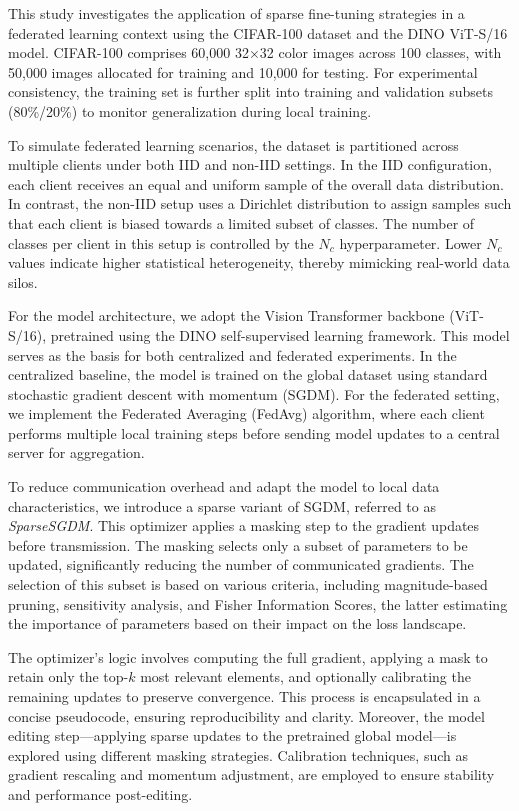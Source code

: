 \documentclass[10pt,twocolumn,letterpaper]{article}
\begin{document}
This study investigates the application of sparse fine-tuning strategies in a federated learning context using the CIFAR-100 dataset and the DINO ViT-S/16 model. CIFAR-100 comprises 60{,}000 32×32 color images across 100 classes, with 50{,}000 images allocated for training and 10{,}000 for testing. For experimental consistency, the training set is further split into training and validation subsets (80\%/20\%) to monitor generalization during local training.

To simulate federated learning scenarios, the dataset is partitioned across multiple clients under both IID and non-IID settings. In the IID configuration, each client receives an equal and uniform sample of the overall data distribution. In contrast, the non-IID setup uses a Dirichlet distribution to assign samples such that each client is biased towards a limited subset of classes. The number of classes per client in this setup is controlled by the $N_c$ hyperparameter. Lower $N_c$ values indicate higher statistical heterogeneity, thereby mimicking real-world data silos.

For the model architecture, we adopt the Vision Transformer backbone (ViT-S/16), pretrained using the DINO self-supervised learning framework. This model serves as the basis for both centralized and federated experiments. In the centralized baseline, the model is trained on the global dataset using standard stochastic gradient descent with momentum (SGDM). For the federated setting, we implement the Federated Averaging (FedAvg) algorithm, where each client performs multiple local training steps before sending model updates to a central server for aggregation.

To reduce communication overhead and adapt the model to local data characteristics, we introduce a sparse variant of SGDM, referred to as \textit{SparseSGDM}. This optimizer applies a masking step to the gradient updates before transmission. The masking selects only a subset of parameters to be updated, significantly reducing the number of communicated gradients. The selection of this subset is based on various criteria, including magnitude-based pruning, sensitivity analysis, and Fisher Information Scores, the latter estimating the importance of parameters based on their impact on the loss landscape.

The optimizer's logic involves computing the full gradient, applying a mask to retain only the top-$k$ most relevant elements, and optionally calibrating the remaining updates to preserve convergence. This process is encapsulated in a concise pseudocode, ensuring reproducibility and clarity. Moreover, the model editing step---applying sparse updates to the pretrained global model---is explored using different masking strategies. Calibration techniques, such as gradient rescaling and momentum adjustment, are employed to ensure stability and performance post-editing.
\end{document}
